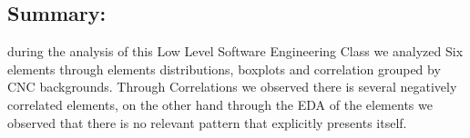 \documentclass[12pt]{extreport}
\begin{document}
\begin{comment}
\subparagraph{Interpretation of the Box-plots:}
For This Element
\begin{enumerate}	
	\item The MP Class Box-Plot:
	\begin{enumerate}
		\item MAX = a {} {} {} {} {} {} {} {} UQ = b {} {} {} {} {} {} {} {} Median = c
		\item LQ = d {} {} {} {} {} {} {} {}  MIN =	l {} {} {} {} {} {} {} {}  IQR = e - f = g
	\end{enumerate}
	\item The PSI Class Box-Plot:
	\begin{enumerate}
		\item MAX = a {} {} {} {} {} {} {} {} UQ = b {} {} {} {} {} {} {} {} Median = c
		\item LQ = d {} {} {} {} {} {} {} {}  MIN =	e {} {} {} {} {} {} {} {} IQR = f - g = h	
	\end{enumerate}
	\item The TSI Class Box-Plot:
	\begin{enumerate}
		\item MAX = a {} {} {} {} {} {} {} {} UQ = b {} {} {} {} {} {} {} {} Median = c
		\item LQ = d {} {} {} {} {} {} {} {} MIN = e {} {} {} {} {} {} {} {} IQR = f - g = h	
	\end{enumerate}
\end{enumerate}



\subparagraph{Interpretation of the histogram:}
This Frequency Distribution is (Skeness) with the following descriptive statistics:
\begin{enumerate}
	\item Mean = 
	\item STD = 
	\item Range = a - b = c
	\item IQR = a-b = c 
\end{enumerate}
\end{comment} 


\subsection{Summary:}
during the analysis of this Low Level Software Engineering Class we analyzed Six elements through elements distributions, boxplots and correlation grouped by CNC backgrounds. Through Correlations we observed there is several negatively correlated elements, on the other hand through the EDA of the elements we observed that there is no relevant pattern that explicitly presents itself.
\end{document}
